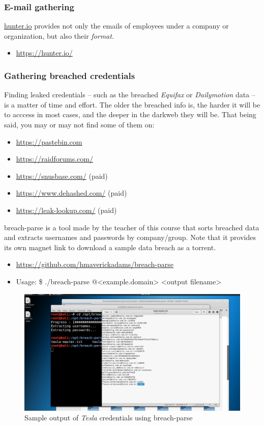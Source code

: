 \documentclass[a4paper,11pt]{article}
\renewcommand{\tt}[2][tt]{\textcolor{#1}{\ttfamily #2}}%
\begin{document}
\subsubsection{E-mail gathering}

\url{hunter.io} provides not only the emails of employees under a company or organization, but also their \textit{format}.
\begin{itemize}
    \item \url{https://hunter.io/}
\end{itemize}

\subsubsection{Gathering breached credentials}

Finding leaked credentials -- such as the breached \textit{Equifax} or \textit{Dailymotion} data -- is a matter of time and effort. The older the breached info is, the harder it will be to acccess in most cases, and the deeper in the darkweb they will be. That being said, you may or may not find some of them on:
\begin{itemize}
    \item \url{https://pastebin.com}
    \item \url{https://raidforums.com/}
    \item \url{https://snusbase.com/} (paid)
    \item \url{https://www.dehashed.com/} (paid)
    \item \url{https://leak-lookup.com/} (paid)
\end{itemize}
\tt{breach-parse} is a tool made by the teacher of this course that sorts breached data and extracts usernames and passwords by company/group. Note that it provides its own magnet link to download a sample data breach as a torrent.
\begin{itemize}
    \item \url{https://github.com/hmaverickadams/breach-parse}
    \item Usage: \tt{\$ ./breach-parse @<example.domain> <output filename>}
\end{itemize}
\begin{figure}[h]
    \centering
    \includegraphics[width=1\textwidth]{images/breachparse.png}
    \caption{Sample output of \textit{Tesla} credentials using breach-parse}
    \label{fig:breachparse}
\end{figure}
\pagebreak
\end{document}
